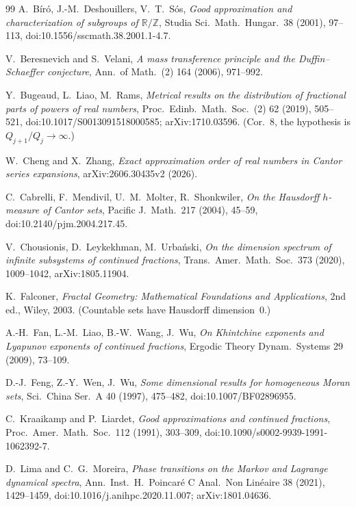 \documentclass[11pt]{article}
\theoremstyle{definition}
\theoremstyle{remark}
\newcommand{\R}{\mathbb{R}}
\newcommand{\Z}{\mathbb{Z}}
\begin{document}
\begin{thebibliography}{99}
 A.~B\'ir\'o, J.-M.~Deshouillers, V.~T.~S\'os, \emph{Good
approximation and characterization of subgroups of $\R/\Z$}, Studia Sci.\ Math.\ Hungar.\ 38 (2001), 97--113, doi:10.1556/\allowbreak sscmath.38.2001.1-4.7.

 V.~Beresnevich and S.~Velani, \emph{A mass transference principle
and the Duffin--Schaeffer conjecture}, Ann.\ of Math.\ (2) 164 (2006), 971--992.

 Y.~Bugeaud, L.~Liao, M.~Rams, \emph{Metrical results on the
distribution of fractional parts of powers of real numbers}, Proc.\ Edinb.\ Math.\ Soc.\ (2) 62 (2019), 505--521, doi:10.1017/\allowbreak S0013091518000585; arXiv:1710.03596. (Cor.~8, the hypothesis is $Q_{j+1}/Q_j\to\infty$.)

 W.~Cheng and X.~Zhang, \emph{Exact approximation order of real numbers in
Cantor series expansions}, arXiv:2606.30435v2 (2026).

 C.~Cabrelli, F.~Mendivil, U.~M.~Molter, R.~Shonkwiler,
\emph{On the Hausdorff $h$-measure of Cantor sets}, Pacific J.\ Math.\ 217
(2004), 45--59, doi:10.2140/\allowbreak pjm.2004.217.45.

 V.~Chousionis, D.~Leykekhman, M.~Urba\'nski, \emph{On the
dimension spectrum of infinite subsystems of continued fractions}, Trans.\ Amer.\ Math.\ Soc.\ 373 (2020), 1009--1042, arXiv:1805.11904.

 K.~Falconer, \emph{Fractal Geometry: Mathematical
Foundations and Applications}, 2nd ed., Wiley, 2003. (Countable sets have
Hausdorff dimension~$0$.)

 A.-H.~Fan, L.-M.~Liao, B.-W.~Wang, J.~Wu, \emph{On Khintchine
exponents and Lyapunov exponents of continued fractions}, Ergodic Theory Dynam.\ Systems 29 (2009), 73--109.

 D.-J.~Feng, Z.-Y.~Wen, J.~Wu, \emph{Some dimensional results
for homogeneous Moran sets}, Sci.\ China Ser.\ A 40 (1997), 475--482,
doi:10.1007/\allowbreak BF02896955.

 C.~Kraaikamp and P.~Liardet, \emph{Good approximations and
continued fractions}, Proc.\ Amer.\ Math.\ Soc.\ 112 (1991), 303--309, doi:10.1090/\allowbreak s0002-9939-1991-1062392-7.

 D.~Lima and C.~G.~Moreira, \emph{Phase transitions on
the Markov and Lagrange dynamical spectra}, Ann.\ Inst.\ H.~Poincar\'e
C Anal.\ Non Lin\'eaire 38 (2021), 1429--1459,
doi:10.1016/\allowbreak j.anihpc.2020.11.007; arXiv:1801.04636.


\end{thebibliography}
\end{document}
